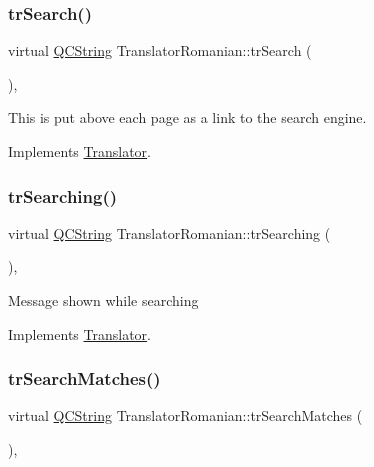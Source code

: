 \subsubsection{\texorpdfstring{trSearch()}{trSearch()}}
{\footnotesize\ttfamily virtual \mbox{\hyperlink{class_q_c_string}{Q\+C\+String}} Translator\+Romanian\+::tr\+Search (\begin{DoxyParamCaption}{ }\end{DoxyParamCaption})\hspace{0.3cm}{\ttfamily [inline]}, {\ttfamily [virtual]}}

This is put above each page as a link to the search engine. 

Implements \mbox{\hyperlink{class_translator}{Translator}}.

\mbox{\label{class_translator_romanian_aec6841684d90acbf20196adadcbcd316}} 
\subsubsection{\texorpdfstring{trSearching()}{trSearching()}}
{\footnotesize\ttfamily virtual \mbox{\hyperlink{class_q_c_string}{Q\+C\+String}} Translator\+Romanian\+::tr\+Searching (\begin{DoxyParamCaption}{ }\end{DoxyParamCaption})\hspace{0.3cm}{\ttfamily [inline]}, {\ttfamily [virtual]}}

Message shown while searching 

Implements \mbox{\hyperlink{class_translator}{Translator}}.

\mbox{\label{class_translator_romanian_a07de29822cde7d96bf057faa87cea30a}} 
\subsubsection{\texorpdfstring{trSearchMatches()}{trSearchMatches()}}
{\footnotesize\ttfamily virtual \mbox{\hyperlink{class_q_c_string}{Q\+C\+String}} Translator\+Romanian\+::tr\+Search\+Matches (\begin{DoxyParamCaption}{ }\end{DoxyParamCaption})\hspace{0.3cm}{\ttfamily [inline]}, {\ttfamily [virtual]}}

